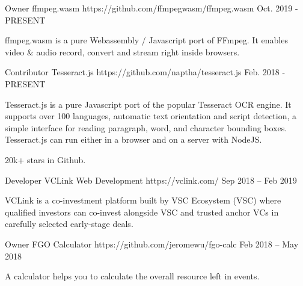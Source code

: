 

\begin{cventries}

  \cventry
    {Owner} %
    {ffmpeg.wasm} %
    {https://github.com/ffmpegwasm/ffmpeg.wasm} %
    {Oct. 2019 - PRESENT} %
    {
      \begin{cvitems} %
        \item {ffmpeg.wasm is a pure Webassembly / Javascript port of FFmpeg. It enables video \& audio record, convert and stream right inside browsers.}
      \end{cvitems}
    }

  \cventry
    {Contributor} %
    {Tesseract.js} %
    {https://github.com/naptha/tesseract.js} %
    {Feb. 2018 - PRESENT} %
    {
      \begin{cvitems} %
        \item {Tesseract.js is a pure Javascript port of the popular Tesseract OCR engine. It supports over 100 languages, automatic text orientation and script detection, a simple interface for reading paragraph, word, and character bounding boxes. Tesseract.js can run either in a browser and on a server with NodeJS.}
        \item {20k+ stars in Github.}
      \end{cvitems}
    }

  \cventry
    {Developer} %
    {VCLink Web Development} %
    {https://vclink.com/} %
    {Sep 2018 – Feb 2019} %
    {
      \begin{cvitems} %
        \item {VCLink is a co-investment platform built by VSC Ecosystem (VSC) where qualified investors can co-invest alongside VSC and trusted anchor VCs in carefully selected early-stage deals.}
      \end{cvitems}
    }

  \cventry
    {Owner} %
    {FGO Calculator} %
    {https://github.com/jeromewu/fgo-calc} %
    {Feb 2018 – May 2018} %
    {
      \begin{cvitems} %
        \item {A calculator helps you to calculate the overall resource left in events.}
      \end{cvitems}
    }

\end{cventries}
